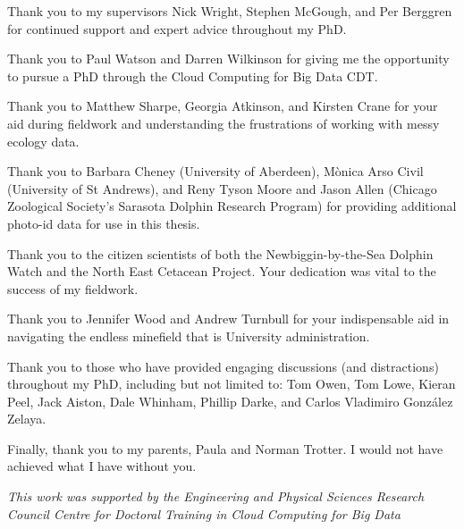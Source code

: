 
\begin{acknowledgements}

\noindent Thank you to my supervisors Nick Wright, Stephen McGough, and Per Berggren for continued support and expert advice throughout my PhD. \newline

\noindent Thank you to Paul Watson and Darren Wilkinson for giving me the opportunity to pursue a PhD through the Cloud Computing for Big Data CDT. \newline

\noindent Thank you to Matthew Sharpe, Georgia Atkinson, and Kirsten Crane for your aid during fieldwork and understanding the frustrations of working with messy ecology data.\newline

\noindent Thank you to Barbara Cheney (University of Aberdeen), M\`{o}nica Arso Civil (University of St Andrews), and Reny Tyson Moore and Jason Allen (Chicago Zoological Society's Sarasota Dolphin Research Program) for providing additional photo-id data for use in this thesis.\newline

\noindent Thank you to the citizen scientists of both the Newbiggin-by-the-Sea Dolphin Watch and the North East Cetacean Project. Your dedication was vital to the success of my fieldwork. \newline

\noindent Thank you to Jennifer Wood and Andrew Turnbull for your indispensable aid in navigating the endless minefield that is University administration.\newline

\noindent Thank you to those who have provided engaging discussions (and distractions) throughout my PhD, including but not limited to: Tom Owen, Tom Lowe, Kieran Peel, Jack Aiston, Dale Whinham, Phillip Darke, and Carlos Vladimiro González Zelaya. \newline

\noindent Finally, thank you to my parents, Paula and Norman Trotter. I would not have achieved what I have without you.\newline

\noindent \centering\textit{This work was supported by the Engineering and Physical Sciences Research Council Centre for Doctoral Training in Cloud Computing for Big Data\newline[EP/L015358/1]} 

\end{acknowledgements}
